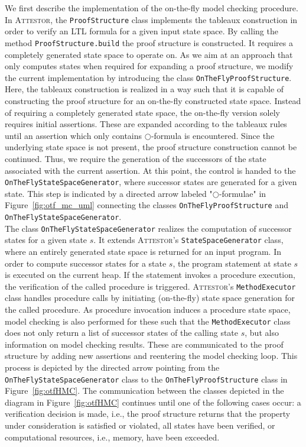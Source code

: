 \documentclass[a4paper, 12pt, twoside]{report}
\begin{document}
	We first describe the implementation of the on-the-fly model checking procedure. In \textsc{Attestor}, the \texttt{ProofStructure} class implements the tableaux construction in order to verify an LTL formula for a given input state space. By calling the method \texttt{ProofStructure.build} the proof structure is constructed. It requires a completely generated state space to operate on. As we aim at an approach that only computes states when required for expanding a proof structure, we modify the current implementation by introducing the class \texttt{OnTheFlyProofStructure}. Here, the tableaux construction is realized in a way such that it is capable of constructing the proof structure for an on-the-fly constructed state space. Instead of requiring a completely generated state space, the on-the-fly version solely requires initial assertions. These are expanded according to the tableaux rules until an assertion which only contains $\bigcirc$-formula is encountered. Since the underlying state space is not present, the proof structure construction cannot be continued. Thus, we require the generation of the successors of the state associated with the current assertion. At this point, the control is handed to the \texttt{OnTheFlyStateSpaceGenerator}, where successor states are generated for a given state. This step is indicated by a directed arrow labeled "$\bigcirc$-formulae" in Figure~\ref{fig:otf_mc_uml} connecting the classes \texttt{OnTheFlyProofStructure} and \texttt{OnTheFlyStateSpaceGenerator}.\\
	
	The class \texttt{OnTheFlyStateSpaceGenerator} realizes the computation of successor states for a given state $s$. It extends \textsc{Attestor}'s \texttt{StateSpaceGenerator} class, where an entirely generated state space is returned for an input program. In order to compute successor states for a state $s$, the program statement at state $s$ is executed on the current heap. If the statement invokes a procedure execution, the verification of the called procedure is triggered. \textsc{Attestor}'s \texttt{MethodExecutor} class handles procedure calls by initiating (on-the-fly) state space generation for the called procedure. As procedure invocation induces a procedure state space, model checking is also performed for these such that the \texttt{MethodExecutor} class does not only return a list of successor states of the calling state $s$, but also information on model checking results. These are communicated to the proof structure by adding new assertions and reentering the model checking loop. This process is depicted by the directed arrow pointing from the \texttt{OnTheFlyStateSpaceGenerator} class to the \texttt{OnTheFlyProofStructure} class in Figure~\ref{fig:otfHMC}. The communication between the classes depicted in the diagram in Figure~\ref{fig:otfHMC} continues until one of the following cases occur: a verification decision is made, i.e., the proof structure returns that the property under consideration is satisfied or violated, all states have been verified, or computational resources, i.e., memory, have been exceeded.\\
	
\end{document}
